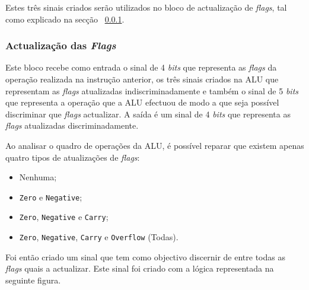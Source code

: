 \documentclass[11pt]{article}
\numberwithin{equation}{section}
\begin{document}
Estes três sinais criados serão utilizados no bloco de actualização de \textit{flags}, tal como explicado na secção ~\ref{subsec:act-flags}.

\subsubsection{Actualização das \textit{Flags}}
\label{subsec:act-flags}

Este bloco recebe como entrada o sinal de 4 \textit{bits} que representa as \textit{flags} da operação realizada na instrução anterior, os três sinais criados na ALU que representam as \textit{flags} atualizadas indiscriminadamente e também o sinal de 5 \textit{bits} que representa a operação que a ALU efectuou de modo a que seja possível discriminar que \textit{flags} actualizar. A saída é um sinal de 4 \textit{bits} que representa as \textit{flags} atualizadas discriminadamente.

Ao analisar o quadro de operações da ALU, é possível reparar que existem apenas quatro tipos de atualizações de \textit{flags}:

\vspace{-2mm}

\begin{itemize}
  \item Nenhuma;
  \vspace{-2.5mm}
  \item \texttt{Zero} e \texttt{Negative};
  \vspace{-2.5mm}
  \item \texttt{Zero}, \texttt{Negative} e \texttt{Carry};
  \vspace{-2.5mm}
  \item \texttt{Zero}, \texttt{Negative}, \texttt{Carry} e \texttt{Overflow} (Todas).
\end{itemize}

Foi então criado um sinal que tem como objectivo discernir de entre todas as \textit{flags} quais a actualizar. Este sinal foi criado com a lógica representada na seguinte figura.
\end{document}
